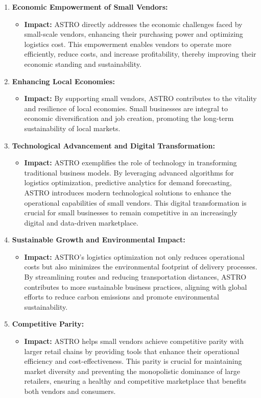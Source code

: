 \begin{enumerate}
	\item \textbf{Economic Empowerment of Small Vendors:}
	      \begin{itemize}
		      \item \textbf{Impact:} ASTRO directly addresses the economic challenges faced by small-scale vendors, enhancing their purchasing power and optimizing logistics cost. This empowerment enables vendors to operate more efficiently, reduce costs, and increase profitability, thereby improving their economic standing and sustainability.
	      \end{itemize}

	\item \textbf{Enhancing Local Economies:}
	      \begin{itemize}
		      \item \textbf{Impact:} By supporting small vendors, ASTRO contributes to the vitality and resilience of local economies. Small businesses are integral to economic diversification and job creation, promoting the long-term sustainability of local markets.
	      \end{itemize}

	\item \textbf{Technological Advancement and Digital Transformation:}
	      \begin{itemize}
		      \item \textbf{Impact:} ASTRO exemplifies the role of technology in transforming traditional business models. By leveraging advanced algorithms for logistics optimization, predictive analytics for demand forecasting, ASTRO introduces modern technological solutions to enhance the operational capabilities of small vendors. This digital transformation is crucial for small businesses to remain competitive in an increasingly digital and data-driven marketplace.
	      \end{itemize}

	\item \textbf{Sustainable Growth and Environmental Impact:}
	      \begin{itemize}
		      \item \textbf{Impact:} ASTRO’s logistics optimization not only reduces operational costs but also minimizes the environmental footprint of delivery processes. By streamlining routes and reducing transportation distances, ASTRO contributes to more sustainable business practices, aligning with global efforts to reduce carbon emissions and promote environmental sustainability.
	      \end{itemize}
	\item \textbf{Competitive Parity:}
	      \begin{itemize}
		      \item \textbf{Impact:} ASTRO helps small vendors achieve competitive parity with larger retail chains by providing tools that enhance their operational efficiency and cost-effectiveness. This parity is crucial for maintaining market diversity and preventing the monopolistic dominance of large retailers, ensuring a healthy and competitive marketplace that benefits both vendors and consumers.
	      \end{itemize}


\end{enumerate}

